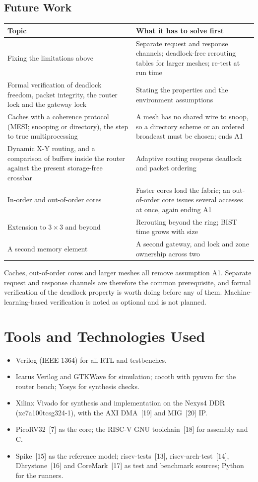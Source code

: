 \documentclass[11pt,a4paper]{article}
\begin{document}
\subsection{Future Work}

\begin{tabularx}{\textwidth}{@{}YY@{}}
\toprule
\textbf{Topic} & \textbf{What it has to solve first} \\
\midrule
Fixing the limitations above & Separate request and response channels;
deadlock-free rerouting tables for larger meshes; re-test at run time \\
Formal verification of deadlock freedom, packet integrity, the router lock
and the gateway lock & Stating the properties and the environment assumptions \\
Caches with a coherence protocol (MESI; snooping or directory), the step to
true multiprocessing & A mesh has no shared wire to snoop, so a directory
scheme or an ordered broadcast must be chosen; ends A1 \\
Dynamic X-Y routing, and a comparison of buffers inside the router against
the present storage-free crossbar & Adaptive routing reopens deadlock and
packet ordering \\
In-order and out-of-order cores & Faster cores load the fabric; an
out-of-order core issues several accesses at once, again ending A1 \\
Extension to $3\times3$ and beyond & Rerouting beyond the ring; BIST time
grows with size \\
A second memory element & A second gateway, and lock and zone ownership
across two \\
\bottomrule
\end{tabularx}

Caches, out-of-order cores and larger meshes all remove assumption A1.
Separate request and response channels are therefore the common prerequisite,
and formal verification of the deadlock property is worth doing before any of
them. Machine-learning-based verification is noted as optional and is not
planned.

\section{Tools and Technologies Used}

\begin{itemize}
\item Verilog (IEEE 1364) for all RTL and testbenches.
\item Icarus Verilog and GTKWave for simulation; cocotb with pyuvm for the
router bench; Yosys for synthesis checks.
\item Xilinx Vivado for synthesis and implementation on the Nexys4 DDR
(xc7a100tcsg324-1), with the AXI DMA~[19] and MIG~[20] IP.
\item PicoRV32~[7] as the core; the RISC-V GNU toolchain~[18] for assembly and C.
\item Spike~[15] as the reference model; riscv-tests~[13],
riscv-arch-test~[14], Dhrystone~[16] and CoreMark~[17] as test and benchmark
sources; Python for the runners.
\end{itemize}
\end{document}
